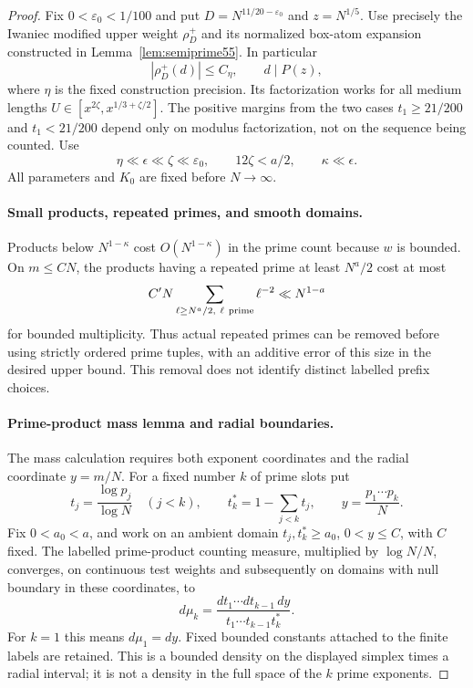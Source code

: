 \documentclass[11pt]{article}
\begin{document}
\begin{proof}
Fix $0<\varepsilon_0<1/100$ and put
$D=N^{11/20-\varepsilon_0}$ and $z=N^{1/5}$.
Use precisely the Iwaniec modified upper weight $\rho_D^+$
and its normalized box-atom expansion constructed in
Lemma~\ref{lem:semiprime55}. In particular
\[
 |\rho_D^+(d)|\le C_\eta,\qquad d\mid P(z),
\]
where $\eta$ is the fixed construction precision.
Its factorization works for all medium lengths
$U\in[x^{2\zeta},x^{1/3+\zeta/2}]$.
The positive margins from the two cases
$t_1\ge21/200$ and $t_1<21/200$ depend only on modulus
factorization, not on the sequence being counted.
Use
\[
 \eta\ll\epsilon\ll\zeta\ll\varepsilon_0,\qquad
 12\zeta<a/2,\qquad \kappa\ll\epsilon .
\]
All parameters and $K_0$ are fixed before $N\to\infty$.

\paragraph{Small products, repeated primes, and smooth domains.}
Products below $N^{1-\kappa}$ cost
$O(N^{1-\kappa})$ in the prime count because $w$ is bounded.
On $m\le CN$, the products having a repeated prime at least
$N^a/2$ cost at most
\[
 C' N\sum_{\ell\ge N^a/2,\ \ell\ {\rm prime}}\ell^{-2}
       \ll N^{1-a}
\]
for bounded multiplicity. Thus actual repeated primes can be
removed before using strictly ordered prime tuples, with an
additive error of this size in the desired upper bound.
This removal does not identify distinct labelled prefix choices.

\paragraph{Prime-product mass lemma and radial boundaries.}
The mass calculation requires both exponent coordinates and the
radial coordinate $y=m/N$. For a fixed number $k$ of prime slots put
\[
 t_j=\frac{\log p_j}{\log N}\quad(j<k),\qquad
 t_k^*=1-\sum_{j<k}t_j,\qquad y=\frac{p_1\cdots p_k}{N}.
\]
Fix $0<a_0<a$, and work on an ambient domain
$t_j,t_k^*\ge a_0$, $0<y\le C$, with $C$ fixed.
The labelled prime-product counting measure, multiplied by $\log N/N$,
converges, on continuous
test weights and subsequently on domains with null boundary in these
coordinates, to
\[
 d\mu_k=\frac{dt_1\cdots dt_{k-1}\,dy}
 {t_1\cdots t_{k-1}t_k^*}.
\]
For $k=1$ this means $d\mu_1=dy$. Fixed bounded constants attached
to the finite labels are retained. This is a bounded density on the
displayed simplex times a radial interval; it is not a density in
the full space of the $k$ prime exponents.


\end{proof}
\end{document}

